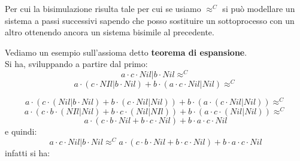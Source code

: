 \documentclass[a4paper,12pt, oneside]{book}
\begin{document}
Per cui la bisimulazione risulta tale per cui se usiamo $\approx^C$ si può
modellare un sistema a passi successivi sapendo che posso sostituire un
sottoprocesso con un altro ottenendo ancora un sistema bisimile al precedente.
\begin{esempio}
  Vediamo un esempio sull'assioma detto \textbf{teorema di espansione}.\\
  Si ha, sviluppando a partire dal primo:
  \[a\cdot c\cdot Nil|b\cdot Nil\approx^C\]
  \[a\cdot(c\cdot NIl|b\cdot Nil)+b\cdot(a\cdot c \cdot Nil|Nil)\approx^C\]

  \[a\cdot(c\cdot(Nil|b\cdot Nil)+b\cdot(c\cdot Nil|Nil))+b\cdot(a\cdot(c\cdot
    Nil|Nil))\approx^C\]
  \[a\cdot (c\cdot b\cdot(NIl|Nil)+b\cdot c\cdot(Nil|NIl))+b\cdot(a\cdot
    c\cdot(Nil|Nil))\approx^C\]
  \[a\cdot(c\cdot b\cdot Nil+b\cdot c\cdot Nil)+b\cdot a\cdot c\cdot Nil\]
  e quindi:
  \[a\cdot c\cdot Nil|b\cdot Nil\approx^Ca\cdot(c\cdot b\cdot Nil+b\cdot c\cdot
    Nil)+b\cdot a\cdot c\cdot Nil\]
  infatti si ha:
   \begin{center}
  \end{center}
\end{esempio}
\end{document}
